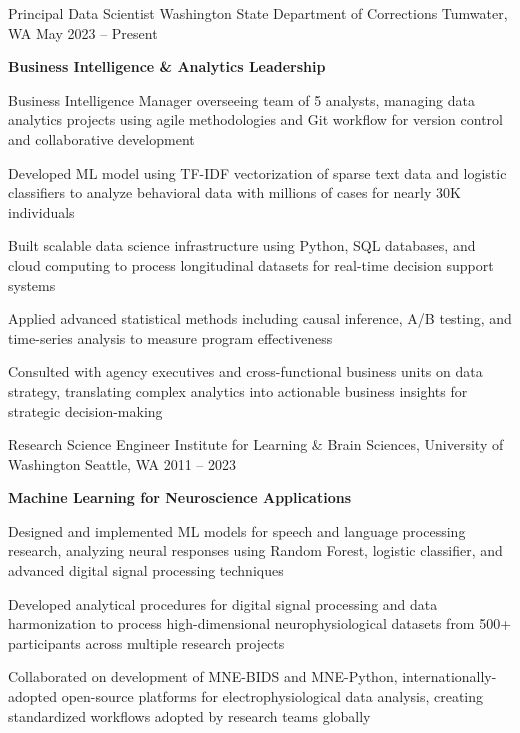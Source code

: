 \begin{cventries}
  \cventry
    {Principal Data Scientist}
    {Washington State Department of Corrections}
    {Tumwater, WA}
    {May 2023 -- Present}
    {
      \begin{cvitems}
        \item \textbf{Business Intelligence \& Analytics Leadership}
        \item Business Intelligence Manager overseeing team of 5 analysts, managing data analytics projects using agile methodologies and Git workflow for version control and collaborative development
        \item Developed ML model using TF-IDF vectorization of sparse text data and logistic classifiers to analyze behavioral data with millions of cases for nearly 30K individuals
        \item Built scalable data science infrastructure using Python, SQL databases, and cloud computing to process longitudinal datasets for real-time decision support systems
        \item Applied advanced statistical methods including causal inference, A/B testing, and time-series analysis to measure program effectiveness
        \item Consulted with agency executives and cross-functional business units on data strategy, translating complex analytics into actionable business insights for strategic decision-making
      \end{cvitems}
    }
  \cventry
    {Research Science Engineer}
    {Institute for Learning \& Brain Sciences, University of Washington}
    {Seattle, WA}
    {2011 -- 2023}
    {
      \begin{cvitems}
        \item \textbf{Machine Learning for Neuroscience Applications}
        \item Designed and implemented ML models for speech and language processing research, analyzing neural responses using Random Forest, logistic classifier, and advanced digital signal processing techniques
        \item Developed analytical procedures for digital signal processing and data harmonization to process high-dimensional neurophysiological datasets from 500+ participants across multiple research projects
        \item Collaborated on development of MNE-BIDS and MNE-Python, internationally-adopted open-source platforms for electrophysiological data analysis, creating standardized workflows adopted by research teams globally

\end{cvitems}}
\end{cventries}
